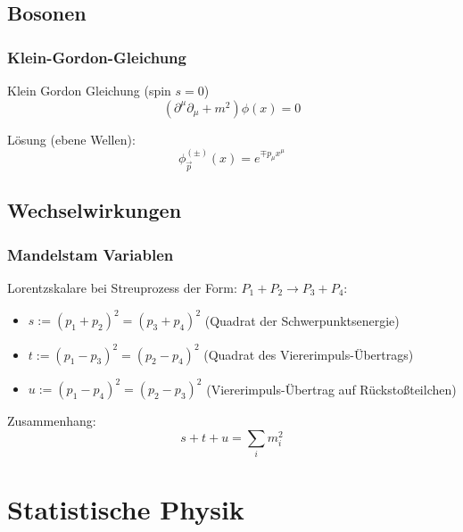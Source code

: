\documentclass[11pt]{article}
\numberwithin{equation}{section}
\begin{document}
    \subsection{Bosonen}
      \subsubsection{Klein-Gordon-Gleichung}
        Klein Gordon Gleichung (spin $s=0$)
        \begin{equation}
          \left(\partial^\mu\partial_\mu+m^2\right) \phi(x) = 0
        \end{equation}

        Lösung (ebene Wellen):
        \begin{equation}
          {\phi}^{ ( \pm ) }_{\vec{p}} (x) = e^{\mp p_\mu x^\mu}
        \end{equation}



    \subsection{Wechselwirkungen}
      \subsubsection{Mandelstam Variablen}
        Lorentzskalare bei Streuprozess der Form: $P_1 + P_2 \rightarrow P_3 + P_4$:
        \begin{itemize}\itemsep -0pt  %
          \item $s:=(p_1+p_2)^2=(p_3+p_4)^2$ \hfill{(Quadrat der Schwerpunktsenergie)}
          \item $t:=(p_1-p_3)^2=(p_2-p_4)^2$ \hfill{(Quadrat des Viererimpuls-Übertrags)}
          \item $u:=(p_1-p_4)^2=(p_2-p_3)^2$ \hfill{(Viererimpuls-Übertrag auf Rückstoßteilchen)}
        \end{itemize}

        Zusammenhang:
        \begin{equation}
          s+t+u = \sum_i m_i^2
        \end{equation}









  \newpage
  \section{Statistische Physik}
\end{document}

